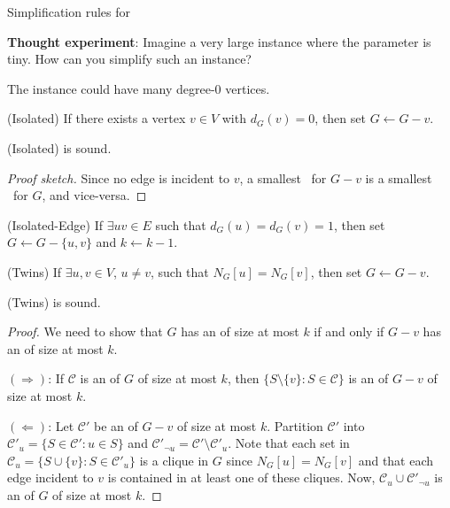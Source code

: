 \begin{frame}{Simplification rules for \ECC}

	\noindent
	\textbf{Thought experiment}: Imagine a very large instance where the parameter is tiny. How can you simplify such an instance?

\end{frame}

\begin{frame}
	\noindent
	The instance could have many degree-0 vertices.

	\begin{block}{(Isolated)}
		If there exists a vertex $v\in V$ with $d_G(v)=0$, then set $G\leftarrow G-v$.
	\end{block}

	\begin{lemma}
		(Isolated) is sound.
	\end{lemma}
	\begin{proof}[Proof sketch]
		Since no edge is incident to $v$, a smallest \ecc\ for $G-v$ is a smallest \ecc\ for $G$, and vice-versa.
	\end{proof}

	\pause

	\begin{block}{(Isolated-Edge)}
		If $\exists uv\in E$ such that $d_G(u)=d_G(v)=1$, then set $G\leftarrow G-\{u,v\}$ and $k\leftarrow k-1$.
	\end{block}
\end{frame}

\begin{frame}

	\begin{block}{(Twins)}
		If $\exists u,v\in V$, $u\ne v$, such that $N_G[u]=N_G[v]$, then set $G\leftarrow G-v$.
	\end{block}

	\begin{lemma}
		(Twins) is sound.
	\end{lemma}
	\pause
	\begin{proof}
		We need to show that $G$ has an \ecc of size at most $k$ if and only if $G-v$ has an \ecc of size at most $k$.

		$(\Rightarrow)$: If $\mathcal{C}$ is an \ecc of $G$ of size at most $k$, then $\{S\setminus \{v\} : S\in \mathcal{C}\}$ is an \ecc of $G-v$ of size at most $k$.

		$(\Leftarrow)$: Let $\mathcal{C}'$ be an \ecc of $G-v$ of size at most $k$. Partition $\mathcal{C}'$ into $\mathcal{C}'_u = \{S\in \mathcal{C}': u\in S\}$ and $\mathcal{C}'_{\neg u} = \mathcal{C}' \setminus \mathcal{C}'_u$. Note that each set in $\mathcal{C}_{u}=\{S\cup \{v\} : S\in \mathcal{C}'_u\}$ is a clique in $G$ since $N_G[u]=N_G[v]$ and that each edge incident to $v$ is contained in at least one of these cliques. Now, $\mathcal{C}_{u} \cup \mathcal{C}'_{\neg u}$ is an \ecc of $G$ of size at most $k$.
	\end{proof}
\end{frame}

